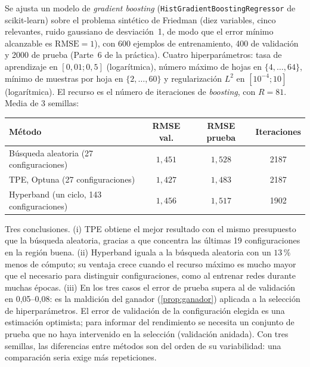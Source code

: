 \begin{ejemplo}\label{ej:hpo}
Se ajusta un modelo de \emph{gradient boosting} (\texttt{HistGradient\-Boosting\-Regressor} de scikit-learn) sobre el problema sintético de Friedman (diez variables, cinco relevantes, ruido gaussiano de desviación~1, de modo que el error mínimo alcanzable es $\mathrm{RMSE}=1$), con 600 ejemplos de entrenamiento, 400 de validación y 2000 de prueba (Parte~6 de la práctica). Cuatro hiperparámetros: tasa de aprendizaje en $[0{,}01;0{,}5]$ (logarítmica), número máximo de hojas en $\{4,\dots,64\}$, mínimo de muestras por hoja en $\{2,\dots,60\}$ y regularización $L^2$ en $[10^{-4};10]$ (logarítmica). El recurso es el número de iteraciones de \emph{boosting}, con $R=81$. Media de 3 semillas:
\begin{center}\small
\begin{tabular}{@{}lccc@{}}
\toprule
Método & RMSE val. & RMSE prueba & Iteraciones \\
\midrule
Búsqueda aleatoria (27 configuraciones) & $1{,}451$ & $1{,}528$ & 2187 \\
TPE, Optuna (27 configuraciones) & $1{,}427$ & $1{,}483$ & 2187 \\
Hyperband (un ciclo, 143 configuraciones) & $1{,}456$ & $1{,}517$ & 1902 \\
\bottomrule
\end{tabular}
\end{center}
Tres conclusiones. (i) TPE obtiene el mejor resultado con el mismo presupuesto que la búsqueda aleatoria, gracias a que concentra las últimas 19 configuraciones en la región buena. (ii) Hyperband iguala a la búsqueda aleatoria con un $13\,\%$ menos de cómputo; su ventaja crece cuando el recurso máximo es mucho mayor que el necesario para distinguir configuraciones, como al entrenar redes durante muchas épocas. (iii) En los tres casos el error de prueba supera al de validación en 0,05–0,08: es la maldición del ganador (\cref{prop:ganador}) aplicada a la selección de hiperparámetros. El error de validación de la configuración elegida es una estimación optimista; para informar del rendimiento se necesita un conjunto de prueba que no haya intervenido en la selección (validación anidada). Con tres semillas, las diferencias entre métodos son del orden de su variabilidad: una comparación seria exige más repeticiones.
\end{ejemplo}

